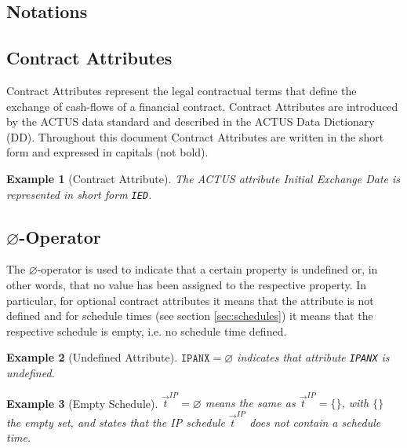 \documentclass[9pt,oneside]{amsart}
\newtheorem{example}{Example}
\newcommand{\attr}[1]{\texttt{#1}}
\newcommand{\undef}{\varnothing}
\begin{document}
\setlength{\columnsep}{20pt}
\begin{multicols}{2}



\section{Notations}\label{sec:notations}

\subsection{Contract Attributes }

Contract Attributes represent the legal contractual terms that define the exchange of cash-flows of a financial contract. Contract Attributes are introduced by the ACTUS data standard and described in the ACTUS Data Dictionary (DD). Throughout this document Contract Attributes are written in the short form and expressed in capitals (not bold). 

\begin{example}[Contract Attribute]
The ACTUS attribute \textit{Initial Exchange Date} is represented in short form \attr{IED}.
\end{example}


\subsection{$\undef$-Operator}

The $\undef$-operator is used to indicate that a certain property is undefined or, in other words, that no value has been assigned to the respective property. In particular, for optional contract attributes it means that the attribute is not defined and for schedule times (see section \ref{sec:schedules}) it means that the respective schedule is empty, i.e. no schedule time defined.

\begin{example}[Undefined Attribute]
$\attr{IPANX}=\undef$ indicates that attribute \attr{IPANX} is undefined.
\end{example}

\begin{example}[Empty Schedule]
$\vec{t}^{IP}=\undef$ means the same as $\vec{t}^{IP}=\{\}$, with $\{\}$ the empty set, and states that the IP schedule $\vec{t}^{IP}$ does not contain a schedule time.
\end{example}



\end{multicols}
\end{document}
